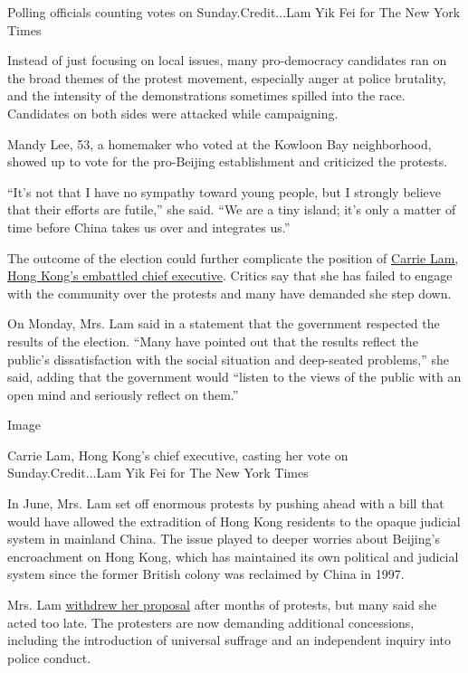 Polling officials counting votes on Sunday.Credit...Lam Yik Fei for The
New York Times

Instead of just focusing on local issues, many pro-democracy candidates
ran on the broad themes of the protest movement, especially anger at
police brutality, and the intensity of the demonstrations sometimes
spilled into the race. Candidates on both sides were attacked while
campaigning.

Mandy Lee, 53, a homemaker who voted at the Kowloon Bay neighborhood,
showed up to vote for the pro-Beijing establishment and criticized the
protests.

``It's not that I have no sympathy toward young people, but I strongly
believe that their efforts are futile,'' she said. ``We are a tiny
island; it's only a matter of time before China takes us over and
integrates us.''

The outcome of the election could further complicate the position of
\href{https://www.nytimes3xbfgragh.onion/2019/09/03/world/asia/hong-kong-protests-carrie-lam.html}{Carrie
Lam, Hong Kong's embattled chief executive}. Critics say that she has
failed to engage with the community over the protests and many have
demanded she step down.

On Monday, Mrs. Lam said in a statement that the government respected
the results of the election. ``Many have pointed out that the results
reflect the public's dissatisfaction with the social situation and
deep-seated problems,'' she said, adding that the government would
``listen to the views of the public with an open mind and seriously
reflect on them.''

Image

Carrie Lam, Hong Kong's chief executive, casting her vote on
Sunday.Credit...Lam Yik Fei for The New York Times

In June, Mrs. Lam set off enormous protests by pushing ahead with a bill
that would have allowed the extradition of Hong Kong residents to the
opaque judicial system in mainland China. The issue played to deeper
worries about Beijing's encroachment on Hong Kong, which has maintained
its own political and judicial system since the former British colony
was reclaimed by China in 1997.

Mrs. Lam
\href{https://www.nytimes3xbfgragh.onion/2019/09/04/world/asia/carrie-lam-hong-kong-protests.html}{withdrew
her proposal} after months of protests, but many said she acted too
late. The protesters are now demanding additional concessions, including
the introduction of universal suffrage and an independent inquiry into
police conduct.

